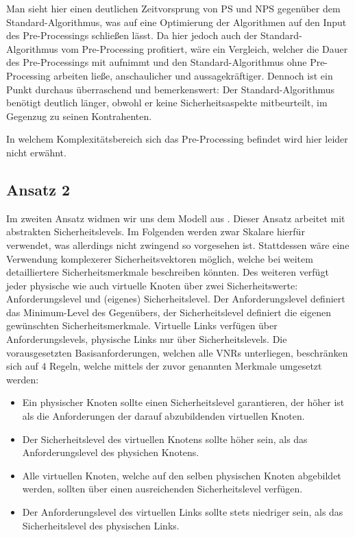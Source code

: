 \documentclass{lni}
\begin{document}
Man sieht  hier einen deutlichen Zeitvorsprung von PS und NPS gegenüber dem Standard-Algorithmus, was auf eine Optimierung der Algorithmen auf den Input des Pre-Processings schließen lässt. Da hier jedoch auch der Standard-Algorithmus vom Pre-Processing profitiert, wäre ein Vergleich, welcher die Dauer des Pre-Processings mit aufnimmt und den Standard-Algorithmus ohne Pre-Processing arbeiten ließe, anschaulicher und aussagekräftiger.
Dennoch ist ein Punkt durchaus überraschend und bemerkenswert: Der Standard-Algorithmus benötigt deutlich länger, obwohl er keine Sicherheitsaspekte mitbeurteilt, im Gegenzug zu seinen Kontrahenten.

In welchem Komplexitätsbereich sich das Pre-Processing befindet wird hier leider nicht erwähnt.


\subsection{Ansatz 2}

Im zweiten Ansatz widmen wir uns dem Modell aus \cite{algo2}. Dieser Ansatz arbeitet mit abstrakten Sicherheitslevels. Im Folgenden werden zwar Skalare hierfür verwendet, was allerdings nicht zwingend so vorgesehen ist. Stattdessen wäre eine Verwendung komplexerer Sicherheitsvektoren möglich, welche bei weitem detailliertere Sicherheitsmerkmale  beschreiben könnten. Des weiteren verfügt jeder physische wie auch virtuelle Knoten über zwei Sicherheitswerte: Anforderungslevel und (eigenes) Sicherheitslevel. Der Anforderungslevel definiert das Minimum-Level des Gegenübers, der Sicherheitslevel definiert die eigenen gewünschten Sicherheitsmerkmale. Virtuelle Links verfügen über Anforderungslevels, physische Links nur über Sicherheitslevels. Die vorausgesetzten Basisanforderungen, welchen alle VNRs unterliegen, beschränken sich auf 4 Regeln, welche mittels der zuvor genannten Merkmale umgesetzt werden:
\begin{itemize}
\item Ein physischer Knoten sollte einen Sicherheitslevel garantieren, 
   der höher ist als die Anforderungen der darauf abzubildenden
   virtuellen Knoten.

\item Der Sicherheitslevel des virtuellen Knotens sollte höher sein, 
   als das Anforderungslevel des physichen Knotens.

\item Alle virtuellen Knoten, welche auf den selben physischen Knoten
   abgebildet werden, sollten über einen ausreichenden Sicherheitslevel
   verfügen. 

\item Der Anforderungslevel des virtuellen Links sollte stets niedriger
   sein, als das Sicherheitslevel des physischen Links.
\end{itemize}
\end{document}
